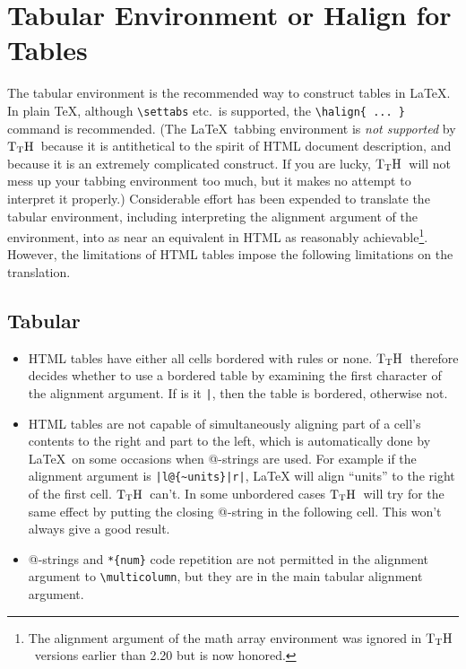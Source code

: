 \documentclass[12pt]{article}
\def\TtH{$\rm{}T_TH$}
\begin{document}
\section{Tabular Environment or Halign for Tables} 
\label{tabhal}
The tabular environment is the recommended way to construct tables in
\LaTeX. In plain \TeX, although \verb|\settabs| etc.~is supported, the
\verb|\halign{ ... }| command is recommended.  (The \LaTeX\ tabbing
environment is \emph{not supported} by \TtH\ because it is antithetical
to the spirit of HTML document description, and because it is an
extremely complicated construct. If you are lucky, \TtH\ will not mess
up your tabbing environment too much, but it makes no attempt to
interpret it properly.) Considerable effort has been expended to
translate the tabular environment, including interpreting the
alignment argument of the environment, into as near an equivalent in
HTML as reasonably achievable\footnote{The alignment argument of the
math array environment was ignored in \TtH\ versions earlier than 2.20
but is now honored.}. However, the limitations of HTML tables impose
the following limitations on the translation.

\subsection{Tabular}
\begin{itemize}

\item HTML tables have either all cells bordered with rules or
none. \TtH\ therefore decides whether to use a bordered table by
examining the first character of the alignment argument. If is it
\verb!|!, then the table is bordered, otherwise not.

\item HTML tables are not capable of simultaneously aligning part of a
cell's contents to the right and part to the left, which is
automatically done by \LaTeX\ on some occasions when @-strings are used.
For example if the alignment argument is \verb!|l@{~units}|r|!, \LaTeX
will align ``units'' to the right of the first cell. \TtH\ can't. In
some unbordered cases \TtH\ will try for the same effect by putting the
closing @-string in the following cell. This won't always give a good
result.

\item @-strings and \verb!*{num}! code repetition are not permitted in the
alignment argument to \verb|\multicolumn|, but they are in the main
tabular alignment argument.
\end{itemize}
\end{document}

